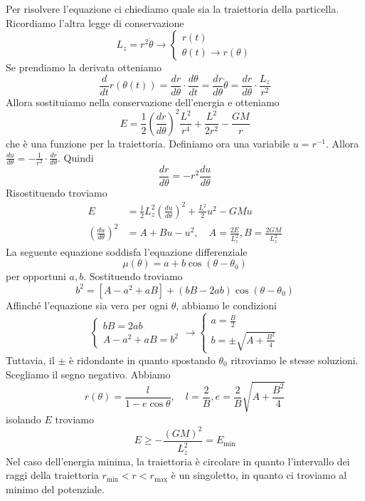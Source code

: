 \documentclass[a4paper]{article}
\begin{document}
Per risolvere l'equazione ci chiediamo quale sia la traiettoria della particella.
Ricordiamo l'altra legge di conservazione
\[
    L_z = r^2 \dot\theta \to \begin{cases}
        r(t) \\
        \theta(t) \to r(\theta)
    \end{cases}
\]
Se prendiamo la derivata otteniamo
\[
    \frac{d}{dt}r(\theta(t))
    = \frac{dr}{d\theta} \cdot \frac{d\theta}{dt}
    = \frac{dr}{d\theta} \dot\theta = \frac{dr}{d\theta} \cdot \frac{L_z}{r^2}
\]
Allora sostituiamo nella conservazione dell'energia e otteniamo
\[
    E = \frac{1}{2}
    {\left(\frac{dr}{d\theta}\right)}^2 \frac{L^2}{r^4} + \frac{L^2}{2r^2} - \frac{GM}{r}
\]
che è una funzione per la traiettoria.
Definiamo ora una variabile
\(u = r^{-1}\).
Allora \(\frac{du}{d\theta} = -\frac{1}{r^2} \cdot \frac{dr}{d\theta}\).
Quindi
\[
    \frac{dr}{d\theta} = -r^2 \frac{du}{d\theta}
\]
Risostituendo troviamo
\begin{align*}
    E &= \frac{1}{2} L_z^2 {\left(\frac{du}{d\theta}\right)}^2 + \frac{L^2}{2}u^2 - GMu \\
    {\left(\frac{du}{d\theta}\right)}^2 &= A + Bu - u^2,
    \quad A = \frac{2E}{L_z^2}, B = \frac{2GM}{L_z^2}
\end{align*}
La seguente equazione soddisfa l'equazione differenziale
\[
    \mu(\theta) = a + b\cos(\theta - \theta_0)
\]
per opportuni \(a,b\).
Sostituendo troviamo
\[
    b^2 = [A-a^2 + aB] + (bB - 2ab)\cos(\theta - \theta_0)
\]
Affinché l'equazione sia vera per ogni \(\theta\), abbiamo le condizioni
\[
    \begin{cases}
        bB = 2ab \\
        A - a^2 + aB = b^2
    \end{cases}
    \to \begin{cases}
        a = \frac{B}{2} \\
        b = \pm\sqrt{A + \frac{B^2}{4}}
    \end{cases}
\]
Tuttavia, il \(\pm\) è ridondante in quanto spostando \(\theta_0\)
ritroviamo le stesse soluzioni. Scegliamo il segno negativo.
Abbiamo
\[
    r(\theta) = \frac{l}{1-e\cos\theta}, \quad l = \frac{2}{B}, e = \frac{2}{B} \sqrt{A + \frac{B^2}{4}}
\]
isolando \(E\) troviamo
\[
    E \geq - \frac{{(GM)}^2}{L_z^2} = E_\text{min}
\]
Nel caso dell'energia minima, la traiettoria è circolare in quanto l'intervallo dei raggi
della traiettoria \(r_\text{min} < r < r_\text{max}\) è un singoletto, in quanto ci troviamo al minimo del potenziale. \\
\end{document}

